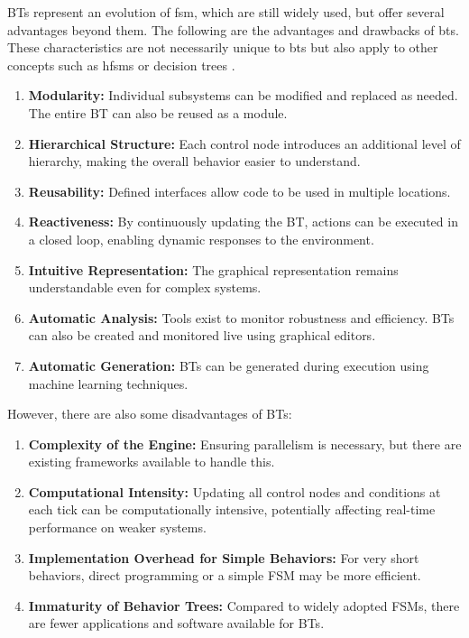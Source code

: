 BTs represent an evolution of \gls{fsm}, which are still widely used, but offer several advantages beyond them. The following are the advantages and drawbacks of \glspl{bt}. These characteristics are not necessarily unique to \glspl{bt} but also apply to other concepts such as \glspl{hfsm} or decision trees \cite{ColledanchiseandÖgren,2018,pp.37ff.}.

\begin{enumerate}
  \item \textbf{Modularity:} Individual subsystems can be modified and replaced as needed. The entire BT can also be reused as a module.
  \item \textbf{Hierarchical Structure:} Each control node introduces an additional level of hierarchy, making the overall behavior easier to understand.
  \item \textbf{Reusability:} Defined interfaces allow code to be used in multiple locations.
  \item \textbf{Reactiveness:} By continuously updating the BT, actions can be executed in a closed loop, enabling dynamic responses to the environment.
  \item \textbf{Intuitive Representation:} The graphical representation remains understandable even for complex systems.
  \item \textbf{Automatic Analysis:} Tools exist to monitor robustness and efficiency. BTs can also be created and monitored live using graphical editors.
  \item \textbf{Automatic Generation:} BTs can be generated during execution using machine learning techniques.
\end{enumerate}

However, there are also some disadvantages of BTs:

\begin{enumerate}
  \item \textbf{Complexity of the Engine:} Ensuring parallelism is necessary, but there are existing frameworks available to handle this.
  \item \textbf{Computational Intensity:} Updating all control nodes and conditions at each tick can be computationally intensive, potentially affecting real-time performance on weaker systems.
  \item \textbf{Implementation Overhead for Simple Behaviors:} For very short behaviors, direct programming or a simple FSM may be more efficient.
  \item \textbf{Immaturity of Behavior Trees:} Compared to widely adopted FSMs, there are fewer applications and software available for BTs.
\end{enumerate}


